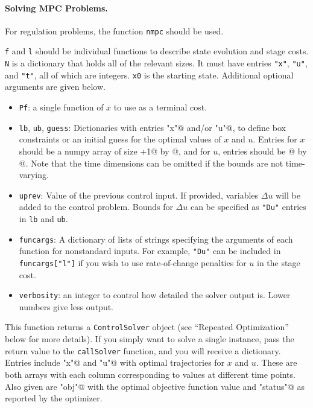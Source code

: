 \documentclass{article}
\begin{document}
\begin{multicols}{2}
\paragraph*{Solving MPC Problems.}

For regulation problems, the function \texttt{nmpc} should be used.


\texttt{f} and \texttt{l} should be individual \casadi{} functions to describe state evolution and stage costs.
\texttt{N} is a dictionary that holds all of the relevant sizes.
It must have entries \lstinline|"x"|, \lstinline|"u"|, and \lstinline|"t"|, all of which are integers.
\texttt{x0} is the starting state.
Additional optional arguments are given below.

\begin{itemize}[noitemsep,nolistsep]
    \item \texttt{Pf}: a single \casadi{} function of $x$ to use as a terminal cost.
    \item \texttt{lb}, \texttt{ub}, \texttt{guess}: Dictionaries with entries \lstinline@"x"@ and/or \lstinline@"u"@, to define box constraints or an initial guess for the optimal values of $x$ and $u$.
    Entries for $x$ should be a numpy array of size \lstinline@N["t"]+1@ by \lstinline@N["x"]@, and for $u$, entries should be \lstinline@N["t"]@ by \lstinline@N["u"]@.
    Note that the time dimensions can be omitted if the bounds are not time-varying.
    \item \texttt{uprev}: Value of the previous control input.
    If provided, variables $\Delta u$ will be added to the control problem.
    Bounds for $\Delta u$ can be specified as \lstinline|"Du"| entries in \texttt{lb} and \texttt{ub}.
    \item \texttt{funcargs}: A dictionary of lists of strings specifying the arguments of each function for nonstandard inputs.
    For example, \lstinline|"Du"| can be included in \lstinline|funcargs["l"]| if you wish to use rate-of-change penalties for $u$ in the stage cost.
    \item \texttt{verbosity}: an integer to control how detailed the solver output is.
    Lower numbers give less output.
\end{itemize}

This function returns a \texttt{ControlSolver} object (see ``Repeated Optimization'' below for more details).
If you simply want to solve a single instance, pass the return value to the \texttt{callSolver} function, and you will receive a dictionary.
Entries include \lstinline@"x"@ and \lstinline@"u"@ with optimal trajectories for $x$ and $u$.
These are both arrays with each column corresponding to values at different time points.
Also given are \lstinline@"obj"@ with the optimal objective function value and \lstinline@"status"@ as reported by the optimizer.


\end{multicols}
\end{document}
